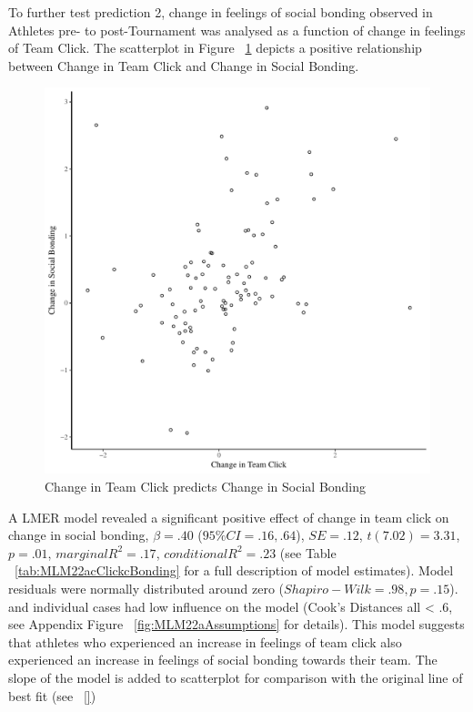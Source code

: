 To further test prediction 2, change in feelings of social bonding observed in Athletes pre- to post-Tournament was analysed as a function of change in feelings of Team Click. The scatterplot in Figure ~\ref{fig:clickBondDeltaBasicXY} depicts a positive relationship between Change in Team Click and Change in Social Bonding.

    \begin{figure}[htbp]
      \centering
    \includegraphics[scale=.5]{images/clickBondDeltaBasicXY.pdf}
      \caption{Change in Team Click predicts Change in Social Bonding}
      \label{fig:clickBondDeltaBasicXY}
    \end{figure}

A LMER model revealed a significant positive effect of change in team click on change in social bonding, $\beta = .40$ ($95\% CI =  .16, .64$), $SE = .12$, $t(7.02) = 3.31$, $p = .01$, $marginal R^2 = .17$, $conditional R^2 = .23$ (see Table ~\ref{tab:MLM22acClickcBonding} for a full description of model estimates).  Model residuals were normally distributed around zero ($Shapiro-Wilk = .98, p = .15$). and individual cases had low influence on the model (Cook's Distances all < .6, see Appendix Figure ~\ref{fig:MLM22aAssumptions} for details). This model suggests that athletes who experienced an increase in feelings of team click also experienced an increase in feelings of social bonding towards their team.  The slope of the model is added to scatterplot for comparison with the original line of best fit (see ~\ref{})

